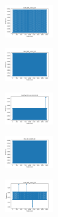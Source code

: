 \begin{figure}[H]
\begin{subfigure}
    \end{subfigure}
    \hfill
    \begin{subfigure}
        \centering
        \includegraphics[width=0.234\textwidth]{img/ageun/ecoli_set_const_10_589741062_time.png}
    \end{subfigure}
    \hfill
    \begin{subfigure}
        \centering
        \includegraphics[width=0.234\textwidth]{img/ageun/rand_set_const_10_589741062_time.png}
    \end{subfigure}
    \hfill
    \begin{subfigure}
        \centering
        \includegraphics[width=0.234\textwidth]{img/ageun/newthyroid_set_const_10_589741062_time.png}
    \end{subfigure}
    \hfill
    \begin{subfigure}
        \centering
        \includegraphics[width=0.234\textwidth]{img/ageun/iris_set_const_10_277451237_time.png}
    \end{subfigure}
    \hfill
    \begin{subfigure}
        \centering
        \includegraphics[width=0.234\textwidth]{img/ageun/ecoli_set_const_10_277451237_time.png}
    \end{subfigure}
    \hfill

\end{figure}
